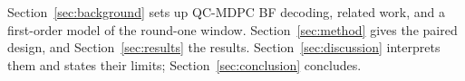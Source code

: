Section~\ref{sec:background} sets up QC-MDPC BF decoding, related work, and a first-order model of the round-one window. Section~\ref{sec:method} gives the paired design, and Section~\ref{sec:results} the results. Section~\ref{sec:discussion} interprets them and states their limits; Section~\ref{sec:conclusion} concludes.
